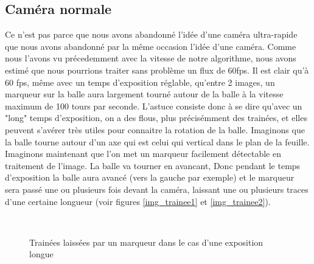 \subsection{Caméra normale}

Ce n'est pas parce que nous avons abandonné l'idée d'une caméra ultra-rapide que nous avons abandonné par la même occasion l'idée d'une caméra. Comme nous l'avons vu précedemment avec la vitesse de notre algorithme, nous avons estimé que nous pourrions traiter sans problème un flux de 60fps. Il est clair qu'à 60 fps, même avec un temps d'exposition réglable, qu'entre 2 images, un marqueur sur la balle aura largement tourné autour de la balle à la vitesse maximum de 100 tours par seconde. L'astuce consiste donc à se dire qu'avec un "long" temps d'exposition, on a des flous, plus précisémment des trainées, et elles peuvent s'avérer très utiles pour connaitre la rotation de la balle. Imaginons que la balle tourne autour d'un axe qui est celui qui vertical dans le plan de la feuille. Imaginons maintenant que l'on met un marqueur facilement détectable en traitement de l'image. La balle va tourner en avancant, Donc pendant le temps d'exposition la balle aura avancé (vers la gauche par exemple) et le marqueur sera passé une ou plusieurs fois devant la caméra, laissant une ou plusieurs traces d'une certaine longueur (voir figures \ref{img_trainee1} et \ref{img_trainee2}).


\begin{figure}
\centering
{}
\\
\caption{Trainées laissées par un marqueur dans le cas d'une exposition longue}
\end{figure}

